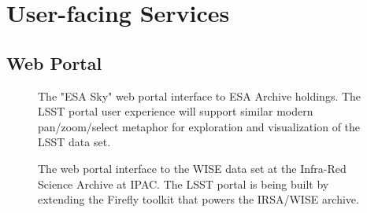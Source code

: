 \section{User-facing Services}

\subsection{Web Portal\label{sec:portal}}

\begin{figure}
	\centering
	\caption{The "ESA Sky" web portal interface to ESA Archive holdings. The LSST portal user
		experience will support similar modern pan/zoom/select metaphor for exploration and visualization of the LSST data set.
		\label{fig:portalESA}}
\end{figure}

\begin{figure}
	\centering
	\caption{The web portal interface to the WISE data set at the Infra-Red Science Archive at IPAC. The LSST portal is being built by extending the Firefly toolkit that powers the IRSA/WISE archive.
		\label{fig:portalIRSA}}
\end{figure}

